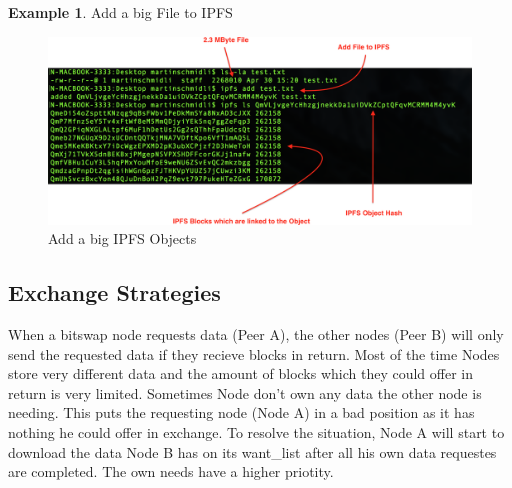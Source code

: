\documentclass[a4paper,11pt, oneside]{report}
\theoremstyle{definition}
\newtheorem{exmp}{Example}[subsection]
\begin{document}
\newpage
\begin{exmp}Add a big File to IPFS \\
\begin{figure}[H]
\centering
\includegraphics[width=\textwidth]{img/ipfs-object-example.png}
\caption[IPFS Objects Example]{Add a big IPFS Objects}
\end{figure}
\end{exmp}



\subsection{Exchange Strategies}
When a bitswap node requests data (Peer A), the other nodes (Peer B) will only send the requested data if they recieve blocks in return. Most of the time Nodes store very different data and the amount of blocks which they could offer in return is very limited. Sometimes Node don't own any data the other node is needing. This puts the requesting node (Node A) in a bad position as it has nothing he could offer in exchange. To resolve the situation, Node A will start to download the data Node B has on its want\_list  after all his own data requestes are completed.  The own needs have a higher priotity.\\ \\
\end{document}
